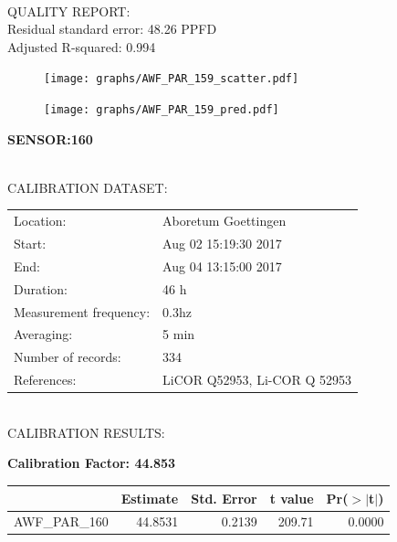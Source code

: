 \documentclass[oneside]{report}
\begin{document}
\hrulefill\\
QUALITY REPORT:\\
Residual standard error: 48.26 PPFD\\
Adjusted R-squared: 0.994



\begin{figure}[H]
  \centering
  \texttt{[image: graphs/AWF\_PAR\_159\_scatter.pdf]}
\end{figure}




\begin{figure}[H]
  \centering
  \texttt{[image: graphs/AWF\_PAR\_159\_pred.pdf]}
\end{figure}

\pagebreak


\begin{center}
\large{\textbf{SENSOR:160}}\\
\end{center}

\hrulefill\\
CALIBRATION DATASET:\\
\begin{table}[h!]
  \centering
  \label{tab:table1}
  \begin{tabular}{ll}
    Location: & Aboretum Goettingen\\ 
    
    
    Start:  & Aug 02 15:19:30 2017 \\
    End:   & Aug 04 13:15:00 2017\\ 
    Duration: & 46 h\\
    Measurement frequency: & 0.3hz\\
    Averaging:  &5 min\\
    Number of records: & 334 \\
    References: & LiCOR Q52953, Li-COR Q 52953 \\
  \end{tabular}
\end{table}

\hrulefill\\
CALIBRATION RESULTS:\\


\begin{center}
\textbf{\large{Calibration Factor: 44.853}}\\
\end{center}
\begin{table}[ht]
\centering
\begin{tabular}{rrrrr}
  \hline
 & Estimate & Std. Error & t value & Pr($>$$|$t$|$) \\ 
  \hline
AWF\_PAR\_160 & 44.8531 & 0.2139 & 209.71 & 0.0000 \\ 
   \hline
\end{tabular}
\end{table}
\end{document}
